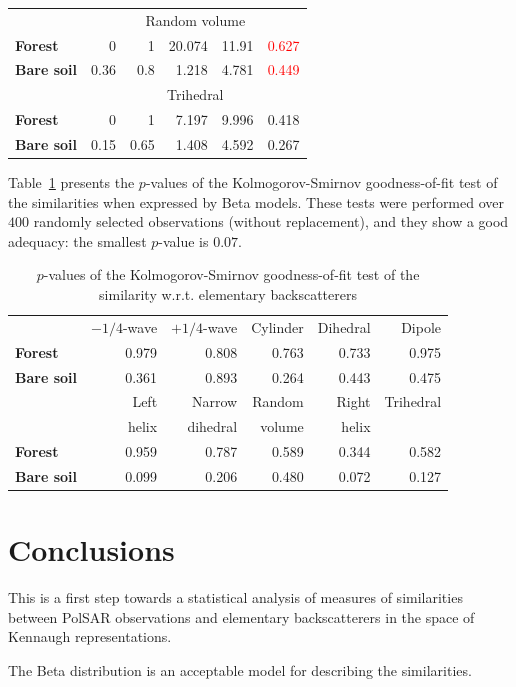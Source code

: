 \documentclass[conference]{IEEEtran}
\begin{document}
\begin{table}[hbt]
\begin{tabular}{lrrrrr}
\midrule
%
& \multicolumn{5}{c}{Random volume}\\
\cmidrule(lr){2-6}
\textbf{Forest} & 0 & 1 & 20.074 & 11.91 & \textcolor{red}{0.627}\\
\textbf{Bare soil} & 0.36 & 0.8 & 1.218 & 4.781 & \textcolor{red}{0.449}\\
\midrule
%
& \multicolumn{5}{c}{Trihedral}\\
\cmidrule(lr){2-6}
\textbf{Forest} & 0 & 1 & 7.197 & 9.996 & 0.418\\
\textbf{Bare soil} & 0.15 & 0.65 & 1.408 & 4.592 & 0.267\\
\bottomrule
\end{tabular}
\end{table}

Table~\ref{tab:pvalues_table} presents the $p$-values of the Kolmogorov-Smirnov goodness-of-fit test of the similarities when expressed by Beta models.
These tests were performed over $400$ randomly selected observations (without replacement), and they show a good adequacy: the smallest $p$-value is $0.07$.

\begin{table}[hbt]
\centering
\caption{$p$-values of the Kolmogorov-Smirnov goodness-of-fit test of the similarity w.r.t. elementary backscatterers}\label{tab:pvalues_table}
\begin{tabular}{lrrrrr}
\toprule
& $-1/4$-wave & $+1/4$-wave & Cylinder & Dihedral & Dipole\\
\cmidrule(lr){2-6}
\textbf{Forest} & 0.979 & 0.808 & 0.763 & 0.733 & 0.975\\
\textbf{Bare soil} & 0.361 & 0.893 & 0.264 & 0.443 & 0.475\\
\midrule
& Left & Narrow & Random & Right & Trihedral\\
             & helix & dihedral & volume & helix & \\
\cmidrule(lr){2-6}
\textbf{Forest} & 0.959 & 0.787 & 0.589 & 0.344 & 0.582\\
\textbf{Bare soil} & 0.099 & 0.206 & 0.480 & 0.072 & 0.127\\
\bottomrule
\end{tabular} 
\end{table}

\section{Conclusions}

This is a first step towards a statistical analysis of measures of similarities between PolSAR observations and elementary backscatterers in the space of Kennaugh representations.

The Beta distribution is an acceptable model for describing the similarities.



\end{document}
